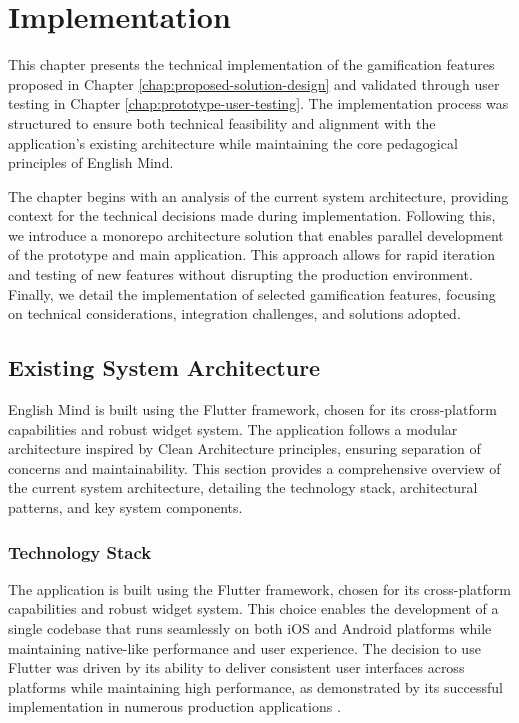 \chapter{Implementation}

This chapter presents the technical implementation of the gamification features proposed in Chapter \ref{chap:proposed-solution-design} and validated through user testing in Chapter \ref{chap:prototype-user-testing}. The implementation process was structured to ensure both technical feasibility and alignment with the application's existing architecture while maintaining the core pedagogical principles of English Mind.

The chapter begins with an analysis of the current system architecture, providing context for the technical decisions made during implementation. Following this, we introduce a monorepo architecture solution that enables parallel development of the prototype and main application. This approach allows for rapid iteration and testing of new features without disrupting the production environment. Finally, we detail the implementation of selected gamification features, focusing on technical considerations, integration challenges, and solutions adopted.

\section{Existing System Architecture}
\label{sec:existing-system-architecture}

English Mind is built using the Flutter framework, chosen for its cross-platform capabilities and robust widget system. The application follows a modular architecture inspired by Clean Architecture principles, ensuring separation of concerns and maintainability. This section provides a comprehensive overview of the current system architecture, detailing the technology stack, architectural patterns, and key system components.
\newpage
\subsection{Technology Stack}

The application is built using the Flutter framework, chosen for its cross-platform capabilities and robust widget system. This choice enables the development of a single codebase that runs seamlessly on both iOS and Android platforms while maintaining native-like performance and user experience. The decision to use Flutter was driven by its ability to deliver consistent user interfaces across platforms while maintaining high performance, as demonstrated by its successful implementation in numerous production applications \cite{cite:google_flutter_case_studies}.

